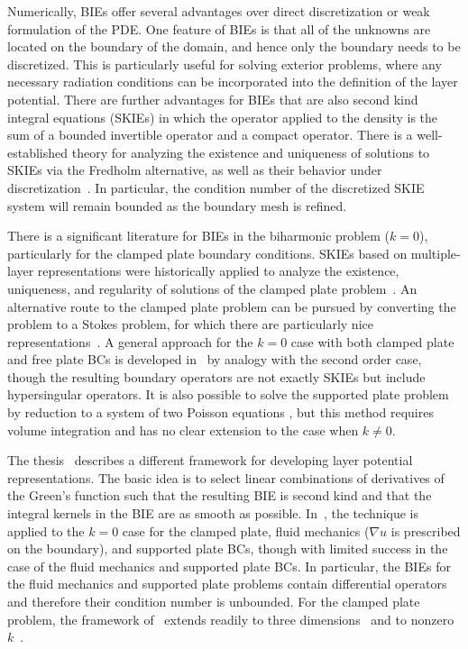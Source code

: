 \documentclass[preprint,12pt,3p]{elsarticle}
\begin{document}
Numerically, BIEs offer several advantages over direct discretization or weak formulation of the
PDE. One feature of BIEs is that all of the unknowns are located on the boundary of the domain, and hence only the boundary needs to be discretized. This is particularly useful for solving exterior problems, where any necessary 
radiation conditions can be incorporated into the definition of the layer potential. There are further 
advantages for BIEs that are also second kind integral equations (SKIEs) in which the operator applied to the density is the sum 
of a bounded invertible operator and a compact operator. There is a well-established theory for analyzing the 
existence and uniqueness of solutions to SKIEs via the Fredholm alternative, as well as their behavior 
under discretization~\cite{kress,colton2013integral,Hackbusch1995}. In particular, the condition number of the discretized SKIE system will remain bounded as 
the boundary mesh is refined. 

There is a significant literature for BIEs in the biharmonic problem ($k=0$),
particularly for the clamped plate boundary conditions. SKIEs based on multiple-layer representations
were historically applied to analyze the existence, uniqueness, and regularity of solutions of the clamped plate 
problem~\cite{agmon1957multiple,cohen1983dirichlet}. An alternative route to the clamped plate problem
can be pursued by converting the problem to a Stokes problem, for which there are particularly
nice representations~\cite{muschelivsvili1933research,Rachh2018}.
A general approach for the $k=0$ case with both clamped plate and free plate BCs
is developed in~\cite[\S 2.4]{hsiao2008boundary} by analogy with the second order
case, though the resulting boundary operators are not exactly SKIEs but include hypersingular operators. 
It is also possible to solve the supported plate problem by reduction
to a system of two Poisson equations  \cite{parisdeleon, sladek}, but this method requires volume integration and has no clear extension to the case when $k \neq 0$.

The thesis~\cite{farkas} describes a different framework for developing layer potential representations. The
basic idea is to select linear combinations of derivatives of the Green's function such that the 
resulting BIE is second kind and that the integral kernels in the BIE are as smooth as possible. In~\cite{farkas},
the technique is applied to the $k=0$ case for the clamped plate, fluid mechanics ($\nabla u$ is prescribed on the boundary),
and supported plate BCs,
though with limited success in the case of the fluid mechanics and supported plate BCs. 
In particular, the BIEs for the fluid mechanics and supported plate problems contain differential operators and therefore their condition number is unbounded. For the clamped plate problem, the framework of~\cite{farkas} extends readily
to three dimensions~\cite{JIANG20117488} and to nonzero $k$~\cite{Lindsay2018}.
\end{document}
